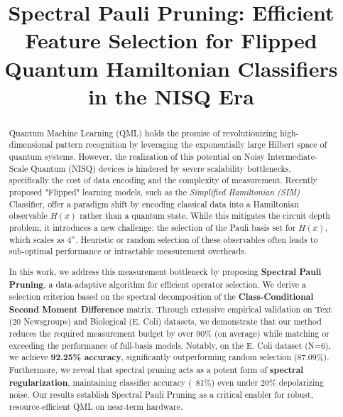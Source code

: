 \documentclass[conference]{IEEEtran}
\begin{document}
\title{Spectral Pauli Pruning: Efficient Feature Selection for Flipped Quantum Hamiltonian Classifiers in the NISQ Era}

\author{
}

\maketitle

\begin{abstract}
Quantum Machine Learning (QML) holds the promise of revolutionizing high-dimensional pattern recognition by leveraging the exponentially large Hilbert space of quantum systems. However, the realization of this potential on Noisy Intermediate-Scale Quantum (NISQ) devices is hindered by severe scalability bottlenecks, specifically the cost of data encoding and the complexity of measurement. Recently proposed "Flipped" learning models, such as the \textit{Simplified Hamiltonian (SIM)} Classifier, offer a paradigm shift by encoding classical data into a Hamiltonian observable $H(x)$ rather than a quantum state. While this mitigates the circuit depth problem, it introduces a new challenge: the selection of the Pauli basis set for $H(x)$, which scales as $4^n$. Heuristic or random selection of these observables often leads to sub-optimal performance or intractable measurement overheads.

In this work, we address this measurement bottleneck by proposing \textbf{Spectral Pauli Pruning}, a data-adaptive algorithm for efficient operator selection. We derive a selection criterion based on the spectral decomposition of the \textbf{Class-Conditional Second Moment Difference} matrix. Through extensive empirical validation on Text (20 Newsgroups) and Biological (E. Coli) datasets, we demonstrate that our method reduces the required measurement budget by over 90\% (on average) while matching or exceeding the performance of full-basis models. Notably, on the E. Coli dataset (N=6), we achieve \textbf{92.25\% accuracy}, significantly outperforming random selection (87.09\%). Furthermore, we reveal that spectral pruning acts as a potent form of \textbf{spectral regularization}, maintaining classifier accuracy (~81\%) even under 20\% depolarizing noise. Our results establish Spectral Pauli Pruning as a critical enabler for robust, resource-efficient QML on near-term hardware.
\end{abstract}
\end{document}

